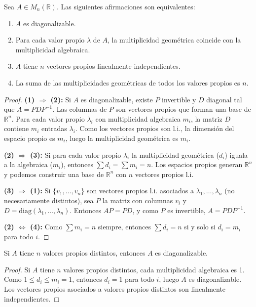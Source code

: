 \begin{theorem}\label{teo:diagonalizacion}
Sea $A \in M_n(\mathbb{R})$. Las siguientes afirmaciones son equivalentes:
\begin{enumerate}[$(1)$]
    \item $A$ es diagonalizable.
    \item Para cada valor propio $\lambda$ de $A$, la multiplicidad geométrica coincide con la multiplicidad algebraica.
    \item $A$ tiene $n$ vectores propios linealmente independientes.
    \item La suma de las multiplicidades geométricas de todos los valores propios es $n$.
\end{enumerate}



\begin{proof} \textbf{(1) $\Rightarrow$ (2):} Si $A$ es diagonalizable, existe $P$ invertible y $D$ diagonal tal que $A = PDP^{-1}$. Las columnas de $P$ son vectores propios que forman una base de $\mathbb{R}^n$. Para cada valor propio $\lambda_i$ con multiplicidad algebraica $m_i$, la matriz $D$ contiene $m_i$ entradas $\lambda_i$. Como los vectores propios son l.i., la dimensión del espacio propio es $m_i$, luego la multiplicidad geométrica es $m_i$.

\textbf{(2) $\Rightarrow$ (3):} Si para cada valor propio $\lambda_i$ la multiplicidad geométrica ($d_i$) iguala a la algebraica ($m_i$), entonces $\sum d_i = \sum m_i = n$. Los espacios propios generan $\mathbb{R}^n$ y podemos construir una base de $\mathbb{R}^n$ con $n$ vectores propios l.i.

\textbf{(3) $\Rightarrow$ (1):} Si $\{v_1,\dots,v_n\}$ son vectores propios l.i. asociados a $\lambda_1,\dots,\lambda_n$ (no necesariamente distintos), sea $P$ la matriz con columnas $v_i$ y $D = \text{diag}(\lambda_1,\dots,\lambda_n)$. Entonces $AP = PD$, y como $P$ es invertible, $A = PDP^{-1}$.

\textbf{(2) $\Leftrightarrow$ (4):} Como $\sum m_i = n$ siempre, entonces $\sum d_i = n$ si y solo si $d_i = m_i$ para todo $i$.
\end{proof}
\end{theorem}
\begin{theorem} Si $A$ tiene $n$ valores propios distintos, entonces $A$ es diagonalizable.
\begin{proof}
Si $A$ tiene $n$ valores propios distintos, cada multiplicidad algebraica es 1. Como $1 \leq d_i \leq m_i = 1$, entonces $d_i = 1$ para todo $i$, luego $A$ es diagonalizable. Los vectores propios asociados a valores propios distintos son linealmente independientes.
\end{proof}
\end{theorem}



